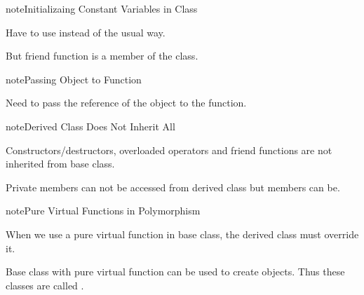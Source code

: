 \documentclass[letterpaper,12pt,english]{sphinxmanual}
\begin{document}
\begin{sphinxadmonition}{note}{Initializaing Constant Variables in Class}

Have to use  instead of the usual way.

But friend function is  a member of the class.
\end{sphinxadmonition}

\begin{sphinxadmonition}{note}{Passing Object to Function}

Need to pass the reference of the object to the function.

\begin{sphinxVerbatim}[commandchars=\\\{\}]
   
\end{sphinxVerbatim}
\end{sphinxadmonition}

\begin{sphinxadmonition}{note}{Derived Class Does Not Inherit All}

Constructors/destructors, overloaded operators and friend functions are not inherited from base class.

Private members can not be accessed from derived class but  members can be.
\end{sphinxadmonition}

\begin{sphinxadmonition}{note}{Pure Virtual Functions in Polymorphism}

When we use a pure virtual function in base class, the derived class must override it.

Base class with pure virtual function can  be used to create objects. Thus these classes are called .

\begin{sphinxVerbatim}[commandchars=\\\{\}]
    
\end{sphinxVerbatim}
\end{sphinxadmonition}
\end{document}
